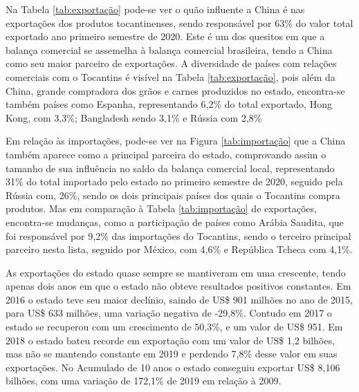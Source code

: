 \par Na Tabela \ref{tab:exportação} pode-se ver o quão influente a China é nas exportações dos produtos tocantinenses, sendo responsável por 63\% do valor total exportado ano primeiro semestre de 2020. Este é um dos quesitos em que a balança comercial se assemelha à balança comercial brasileira, tendo a China como seu maior parceiro de exportações. A diversidade de países com relações comerciais com o Tocantins é visível na Tabela \ref{tab:exportação}, pois além da China, grande compradora dos grãos e carnes produzidos no estado, encontra-se também países como Espanha, representando 6,2\% do total exportado, Hong Kong, com 3,3\%; Bangladesh sendo 3,1\% e Rússia com 2,8\%


\par Em relação às importações, pode-se ver na Figura \ref{tab:importação} que a China também aparece como a principal parceira do estado, comprovando assim o tamanho de sua influência no saldo da balança comercial local, representando 31\% do total importado pelo estado no primeiro semestre de 2020, seguido pela Rússia com, 26\%, sendo os dois principais países dos quais o Tocantins compra produtos. Mas em comparação à Tabela \ref{tab:importação} de exportações, encontra-se mudanças, como a participação de países como Arábia Saudita, que foi responsável por 9,2\% das importações do Tocantins, sendo o terceiro principal parceiro nesta lista, seguido por México, com 4,6\% e República Tcheca com 4,1\%.



\par As exportações do estado quase sempre se mantiveram em uma crescente, tendo apenas dois anos em que o estado não obteve resultados positivos constantes. Em 2016 o estado teve seu maior declínio, saindo de US\$ 901 milhões no ano de 2015, para US\$ 633 milhões, uma variação negativa de -29,8\%. Contudo em 2017 o estado se recuperou com um crescimento de 50,3\%, e um valor de US\$ 951. Em 2018 o estado bateu recorde em exportação com um valor de US\$ 1,2 bilhões, mas não se mantendo constante em 2019 e perdendo 7,8\% desse valor em suas exportações. No Acumulado de 10 anos o estado conseguiu exportar US\$ 8,106 bilhões, com uma variação de 172,1\% de 2019 em relação à 2009.

